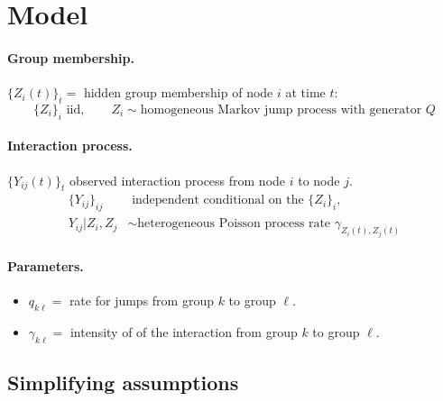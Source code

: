 \documentclass[a4paper, 12pt]{article}
\newcommand{\kl}{{k\ell}}
\begin{document}
\newpage
\section{Model}

\paragraph{Group membership.} $\{Z_i(t)\}_t =$ hidden group membership of node $i$ at time $t$:
$$
\{Z_i\}_i \text{ iid}, 
\qquad 
Z_i \sim \text{homogeneous Markov jump process with generator } Q
$$

\paragraph{Interaction process.} $\{Y_{ij}(t)\}_t$ observed interaction process from node $i$ to node $j$.
\begin{align*}
  \{Y_{ij}\}_{ij} & \text{ independent conditional on the } \{Z_i\}_i, \\
  Y_{ij} | Z_i ,Z_j & \sim \text{heterogeneous Poisson process rate } \gamma_{Z_i(t), Z_j(t)}
\end{align*}

\paragraph{Parameters.}
\begin{itemize}
 \item $q_\kl =$ rate for jumps from group $k$ to group $\ell$.
 \item $\gamma_\kl =$ intensity of of the interaction from group $k$ to group $\ell$.
\end{itemize}

\subsection{Simplifying assumptions}
\end{document}
